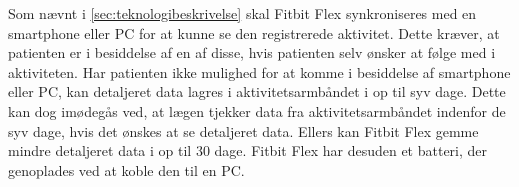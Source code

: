 Som nævnt i \autoref{sec:teknologibeskrivelse} skal Fitbit Flex synkroniseres med en smartphone eller PC for at kunne se den registrerede aktivitet. Dette kræver, at patienten er i besiddelse af en af disse, hvis patienten selv ønsker at følge med i aktiviteten. Har patienten ikke mulighed for at komme i besiddelse af smartphone eller PC, kan detaljeret data lagres i aktivitetsarmbåndet i op til syv dage. Dette kan dog imødegås ved, at lægen tjekker data fra aktivitetsarmbåndet indenfor de syv dage, hvis det ønskes at se detaljeret data. Ellers kan Fitbit Flex gemme mindre detaljeret data i op til 30 dage. Fitbit Flex har desuden et batteri, der genoplades ved at koble den til en PC. 
